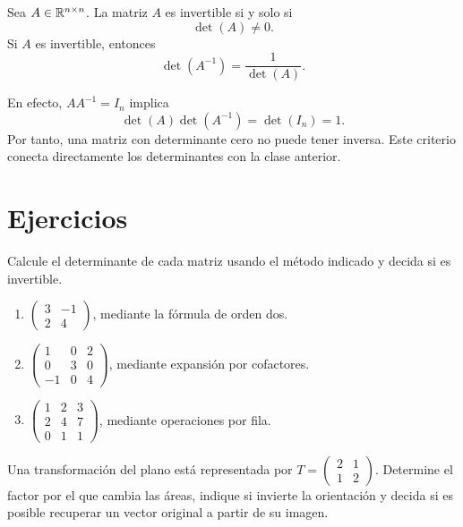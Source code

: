 \documentclass[compacto,10pt]{pubciencias-notas}
\begin{document}
\begin{teo}\label{sem04cl02:teo-invertible}
    Sea $A\in\Mat[\R]{n}{n}$. La matriz $A$ es invertible si y solo si
    \[
        \det(A)\ne0.
    \]
    Si $A$ es invertible, entonces
    \[
        \det(A^{-1})=\frac{1}{\det(A)}.
    \]
\end{teo}

En efecto, $AA^{-1}=I_n$ implica
\[
    \det(A)\det(A^{-1})=\det(I_n)=1.
\]
Por tanto, una matriz con determinante cero no puede tener inversa. Este
criterio conecta directamente los determinantes con la clase anterior.

\section{Ejercicios}

\begin{ejer}
    Calcule el determinante de cada matriz usando el método indicado y decida
    si es invertible.
    \begin{enumerate}
        \item $\begin{pmatrix}3&-1\\2&4\end{pmatrix}$, mediante la fórmula de
              orden dos.
        \item $\begin{pmatrix}1&0&2\\0&3&0\\-1&0&4\end{pmatrix}$, mediante
              expansión por cofactores.
        \item $\begin{pmatrix}1&2&3\\2&4&7\\0&1&1\end{pmatrix}$, mediante
              operaciones por fila.
    \end{enumerate}
\end{ejer}

\begin{ejer}[Aplicación]
    Una transformación del plano está representada por
    $T=\begin{pmatrix}2&1\\1&2\end{pmatrix}$. Determine el factor por el que
    cambia las áreas, indique si invierte la orientación y decida si es
    posible recuperar un vector original a partir de su imagen.
\end{ejer}
\end{document}
